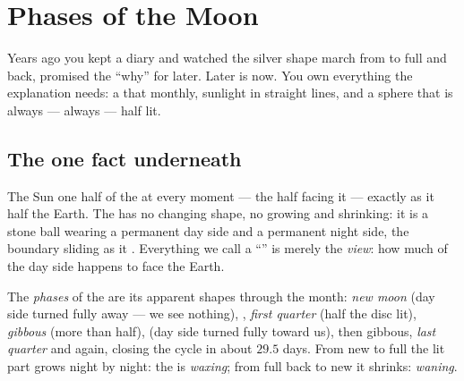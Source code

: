 \chapter{Phases of the Moon}\label{ch:g7:moon-phases}

Years ago you kept a  diary and watched the silver shape march
from  to full and back, promised the ``why'' for later.
Later is now. You own everything the explanation needs: a 
that  monthly, sunlight in straight lines, and a sphere
that is always --- always --- half lit.

\section{The one fact underneath}

\begin{proposition}\label{prop:g7:moon-phases:halflit}
The Sun  one half of the  at every moment --- the half
facing it --- exactly as it  half the Earth. The  has
no changing shape, no growing and shrinking: it is a stone ball
wearing a permanent day side and a permanent night side, the
boundary sliding as it . Everything we call a ``'' is
merely the \emph{view}: how much of the day side happens to face
the Earth.
\end{proposition}

\begin{definition}[Phases]\label{def:g7:moon-phases:phases}
The \emph{phases} of the  are its apparent
shapes through the month: \emph{new moon} (day side turned fully
away --- we see nothing), \emph{}, \emph{first quarter}
(half the disc lit), \emph{gibbous} (more than half),
\emph{} (day side turned fully toward us), then gibbous,
\emph{last quarter} and  again, closing the cycle in
about $29.5$ days. From new to full the lit part grows night by
night: the  is \emph{waxing}; from full back
to new it shrinks: \emph{waning}.
\end{definition}

